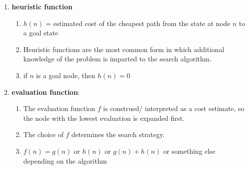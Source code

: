\begin{enumerate}[itemsep=0.2cm]
    \item \textbf{heuristic function}
    \begin{enumerate}
        \item $h(n)$ = estimated cost of the cheapest path from the state at node $n$ to a goal state
        \hfill \cite{ai/book/Artificial-Intelligence-A-Modern-Approach/Russell-Norvig}

        \item Heuristic functions are the most common form in which additional knowledge of the problem is imparted to the search algorithm. 
        \hfill \cite{ai/book/Artificial-Intelligence-A-Modern-Approach/Russell-Norvig}
        
        \item if $n$ is a goal node, then $h(n)=0$
        \hfill \cite{ai/book/Artificial-Intelligence-A-Modern-Approach/Russell-Norvig}
    \end{enumerate}

    \item \textbf{evaluation function}:
    \begin{enumerate}
        \item The evaluation function $f$ is construed/ interpreted as a cost estimate, so the node with the lowest evaluation is expanded first.
        \hfill \cite{ai/book/Artificial-Intelligence-A-Modern-Approach/Russell-Norvig}
        
        \item The choice of $f$ determines the search strategy.
        \hfill \cite{ai/book/Artificial-Intelligence-A-Modern-Approach/Russell-Norvig}

        \item $f(n) = g(n)$ or $h(n)$ or $g(n)+h(n)$ or something else depending on the algorithm
    \end{enumerate}
\end{enumerate}


















